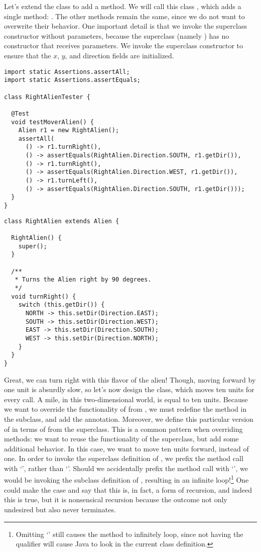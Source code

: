 Let's extend the  class to add a  method. We will call this class , which adds a single method: . The other methods remain the same, since we do not want to overwrite their behavior. One important detail is that we invoke the superclass constructor without parameters, because the superclass (namely ) has no constructor that receives parameters. We invoke the superclass constructor to ensure that the $x$, $y$, and direction fields are initialized.

\begin{lstlisting}[language=MyJava]
import static Assertions.assertAll;
import static Assertions.assertEquals;

class RightAlienTester {

  @Test
  void testMoverAlien() {
    Alien r1 = new RightAlien();
    assertAll(
      () -> r1.turnRight(),
      () -> assertEquals(RightAlien.Direction.SOUTH, r1.getDir()),
      () -> r1.turnRight(),
      () -> assertEquals(RightAlien.Direction.WEST, r1.getDir()),
      () -> r1.turnLeft(),
      () -> assertEquals(RightAlien.Direction.SOUTH, r1.getDir()));
  }
}
\end{lstlisting}

\begin{lstlisting}[language=MyJava]
class RightAlien extends Alien {

  RightAlien() { 
    super(); 
  }

  /**
   * Turns the Alien right by 90 degrees.
   */
  void turnRight() {
    switch (this.getDir()) {
      NORTH -> this.setDir(Direction.EAST);
      SOUTH -> this.setDir(Direction.WEST);
      EAST -> this.setDir(Direction.SOUTH);
      WEST -> this.setDir(Direction.NORTH);
    }
  }
}
\end{lstlisting}

Great, we can turn right with this flavor of the alien! Though, moving forward by one unit is absurdly slow, so let's now design the  class, which moves ten units for every  call. A mile, in this two-dimensional world, is equal to ten units. Because we want to override the functionality of  from , we must redefine the method in the subclass, and add the  annotation. Moreover, we define this particular version of  in terms of  from the superclass. This is a common pattern when overriding methods: we want to reuse the functionality of the superclass, but add some additional behavior. In this case, we want to move ten units forward, instead of one. In order to invoke the superclass definition of , we prefix the method call with `', rather than `'. Should we accidentally prefix the method call with `', we would be invoking the subclass definition of , resulting in an infinite loop!\footnote{Omitting `' still causes the method to infinitely loop, since not having the qualifier will cause Java to look in the current class definition.} One could make the case and say that this is, in fact, a form of recursion, and indeed this is true, but it is nonsensical recursion because the outcome not only undesired but also never terminates.

